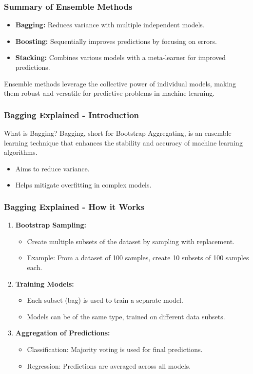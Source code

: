 \documentclass[aspectratio=169]{beamer}
\begin{document}
\begin{frame}[fragile]
  \frametitle{Summary of Ensemble Methods}
  \begin{itemize}
    \item \textbf{Bagging:} Reduces variance with multiple independent models.
    \item \textbf{Boosting:} Sequentially improves predictions by focusing on errors.
    \item \textbf{Stacking:} Combines various models with a meta-learner for improved predictions.
  \end{itemize}
  Ensemble methods leverage the collective power of individual models, making them robust and versatile for predictive problems in machine learning.
\end{frame}

\begin{frame}[fragile]
  \frametitle{Bagging Explained - Introduction}
  \begin{block}{What is Bagging?}
    Bagging, short for Bootstrap Aggregating, is an ensemble learning technique that enhances the stability and accuracy of machine learning algorithms. 
  \end{block}
  \begin{itemize}
    \item Aims to reduce variance.
    \item Helps mitigate overfitting in complex models.
  \end{itemize}
\end{frame}

\begin{frame}[fragile]
  \frametitle{Bagging Explained - How it Works}
  \begin{enumerate}
    \item \textbf{Bootstrap Sampling:}
    \begin{itemize}
      \item Create multiple subsets of the dataset by sampling with replacement.
      \item Example: From a dataset of 100 samples, create 10 subsets of 100 samples each.
    \end{itemize}
    
    \item \textbf{Training Models:}
    \begin{itemize}
      \item Each subset (bag) is used to train a separate model.
      \item Models can be of the same type, trained on different data subsets.
    \end{itemize}
    
    \item \textbf{Aggregation of Predictions:}
    \begin{itemize}
      \item Classification: Majority voting is used for final predictions.
      \item Regression: Predictions are averaged across all models.
    \end{itemize}
  \end{enumerate}
\end{frame}
\end{document}
